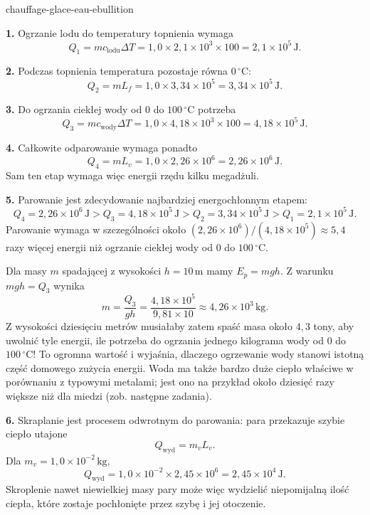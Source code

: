 \begin{exo}{chauffage-glace-eau-ebullition}
\begin{solution}
\textbf{1.} Ogrzanie lodu do temperatury topnienia wymaga
\[
Q_1=mc_{\text{lodu}}\Delta T
=1{,}0\times2{,}1\times10^3\times100
=2{,}1\times10^5\,\text{J}.
\]

\textbf{2.} Podczas topnienia temperatura pozostaje równa $0\,{}^\circ\text{C}$:
\[
Q_2=mL_f=1{,}0\times3{,}34\times10^5
=3{,}34\times10^5\,\text{J}.
\]

\textbf{3.} Do ogrzania ciekłej wody od $0$ do $100\,{}^\circ\text{C}$ potrzeba
\[
Q_3=mc_{\text{wody}}\Delta T
=1{,}0\times4{,}18\times10^3\times100
=4{,}18\times10^5\,\text{J}.
\]

\textbf{4.} Całkowite odparowanie wymaga ponadto
\[
Q_4=mL_v=1{,}0\times2{,}26\times10^6
=2{,}26\times10^6\,\text{J}.
\]
Sam ten etap wymaga więc energii rzędu kilku megadżuli.

\textbf{5.} Parowanie jest zdecydowanie najbardziej energochłonnym etapem:
\[
Q_4=2{,}26\times10^6\,\text{J}
>Q_3=4{,}18\times10^5\,\text{J}
>Q_2=3{,}34\times10^5\,\text{J}
>Q_1=2{,}1\times10^5\,\text{J}.
\]
Parowanie wymaga w szczególności około $(2{,}26\times10^6)/(4{,}18\times10^5)\approx5{,}4$ razy więcej energii niż ogrzanie ciekłej wody od $0$ do $100\,{}^\circ\text{C}$.

Dla masy $m$ spadającej z wysokości $h=10\,\text{m}$ mamy $E_p=mgh$. Z warunku $mgh=Q_3$ wynika
\[
m=\frac{Q_3}{gh}
=\frac{4{,}18\times10^5}{9{,}81\times10}
\approx4{,}26\times10^3\,\text{kg}.
\]
Z wysokości dziesięciu metrów musiałaby zatem spaść masa około $4{,}3$ tony, aby uwolnić tyle energii, ile potrzeba do ogrzania jednego kilograma wody od $0$ do $100\,{}^\circ\text{C}$! To ogromna wartość i wyjaśnia, dlaczego ogrzewanie wody stanowi istotną część domowego zużycia energii. Woda ma także bardzo duże ciepło właściwe w porównaniu z typowymi metalami; jest ono na przykład około dziesięć razy większe niż dla miedzi (zob. następne zadania).

\textbf{6.} Skraplanie jest procesem odwrotnym do parowania: para przekazuje szybie ciepło utajone
\[
Q_{\text{wyd}}=m_vL_v.
\]
Dla $m_v=1{,}0\times10^{-2}\,\text{kg}$,
\[
Q_{\text{wyd}}=1{,}0\times10^{-2}\times2{,}45\times10^6
=2{,}45\times10^4\,\text{J}.
\]
Skroplenie nawet niewielkiej masy pary może więc wydzielić niepomijalną ilość ciepła, które zostaje pochłonięte przez szybę i jej otoczenie.
\end{solution}
\end{exo}

